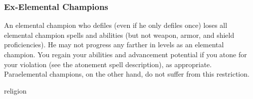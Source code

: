 {\subsubsection{Ex-Elemental Champions}
An elemental champion who defiles (even if he only defiles once) loses all elemental champion spells and abilities (but not weapon, armor, and shield proficiencies). He may not progress any farther in levels as an elemental champion. You regain your abilities and advancement potential if you atone for your violation (see the atonement spell description), as appropriate. Paraelemental champions, on the other hand, do not suffer from this restriction.
}
{}
{religion}
{}
{}
{}